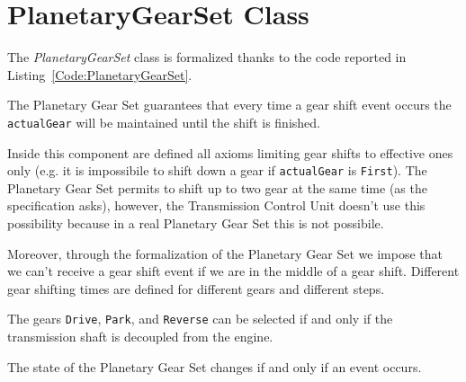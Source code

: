 \section{PlanetaryGearSet Class}
\label{Section:PlanetaryGearSet}
The \emph{PlanetaryGearSet} class is formalized thanks to the code reported in Listing~\ref{Code:PlanetaryGearSet}.

The Planetary Gear Set guarantees that every time a gear shift event occurs the \texttt{actualGear} will be maintained until the shift is finished.

Inside this component are defined all axioms limiting gear shifts to effective ones only (e.g. it is impossibile to shift down a gear if \texttt{actualGear} is \texttt{First}). The Planetary Gear Set permits to shift up to two gear at the same time (as the specification asks), however, the Transmission Control Unit doesn't use this possibility because in a real Planetary Gear Set this is not possibile.

Moreover, through the formalization of the Planetary Gear Set we impose that we can't receive a gear shift event if we are in the middle of a gear shift. Different gear shifting times are defined for different gears and different steps.

The gears \texttt{Drive}, \texttt{Park}, and \texttt{Reverse} can be selected if and only if the transmission shaft is decoupled from the engine.

The state of the Planetary Gear Set changes if and only if an event occurs.


